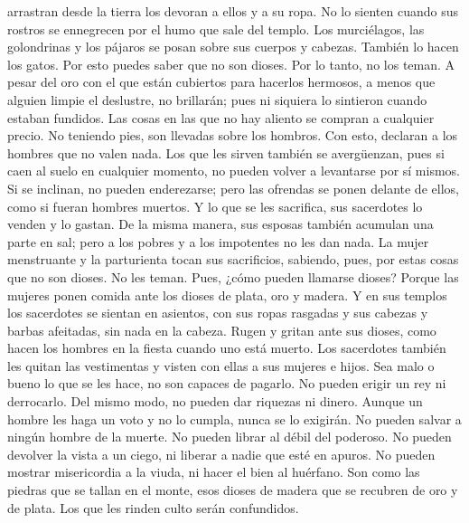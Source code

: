 arrastran desde la tierra los devoran a ellos y a su ropa. No lo sienten
 cuando sus rostros se ennegrecen por el humo que sale
del templo.  Los murciélagos, las golondrinas y los
pájaros se posan sobre sus cuerpos y cabezas. También lo hacen los
gatos.  Por esto puedes saber que no son dioses. Por lo
tanto, no los teman.  A pesar del oro con el que están
cubiertos para hacerlos hermosos, a menos que alguien limpie el
deslustre, no brillarán; pues ni siquiera lo sintieron cuando estaban
fundidos.  Las cosas en las que no hay aliento se compran
a cualquier precio.  No teniendo pies, son llevadas sobre
los hombros. Con esto, declaran a los hombres que no valen nada.
 Los que les sirven también se avergüenzan, pues si caen
al suelo en cualquier momento, no pueden volver a levantarse por sí
mismos. Si se inclinan, no pueden enderezarse; pero las ofrendas se
ponen delante de ellos, como si fueran hombres muertos. 
Y lo que se les sacrifica, sus sacerdotes lo venden y lo gastan. De la
misma manera, sus esposas también acumulan una parte en sal; pero a los
pobres y a los impotentes no les dan nada.  La mujer
menstruante y la parturienta tocan sus sacrificios, sabiendo, pues, por
estas cosas que no son dioses. No les teman.  Pues, ¿cómo
pueden llamarse dioses? Porque las mujeres ponen comida ante los dioses
de plata, oro y madera.  Y en sus templos los sacerdotes
se sientan en asientos, con sus ropas rasgadas y sus cabezas y barbas
afeitadas, sin nada en la cabeza.  Rugen y gritan ante
sus dioses, como hacen los hombres en la fiesta cuando uno está muerto.
 Los sacerdotes también les quitan las vestimentas y
visten con ellas a sus mujeres e hijos.  Sea malo o bueno
lo que se les hace, no son capaces de pagarlo. No pueden erigir un rey
ni derrocarlo.  Del mismo modo, no pueden dar riquezas ni
dinero. Aunque un hombre les haga un voto y no lo cumpla, nunca se lo
exigirán.  No pueden salvar a ningún hombre de la muerte.
No pueden librar al débil del poderoso.  No pueden
devolver la vista a un ciego, ni liberar a nadie que esté en apuros.
 No pueden mostrar misericordia a la viuda, ni hacer el
bien al huérfano.  Son como las piedras que se tallan en
el monte, esos dioses de madera que se recubren de oro y de plata. Los
que les rinden culto serán confundidos.

